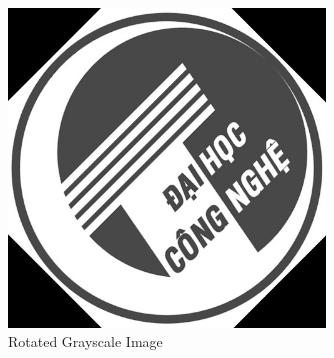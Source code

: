 \documentclass{article}
\begin{document}
\begin{figure}[H]
    \centering
    \includegraphics[width=0.75\textwidth]{lena_gray_rotated.jpg}
    \caption{Rotated Grayscale Image}
    \label{fig:rotated_grayscale_img}
\end{figure}

\printbibliography
\end{document}

